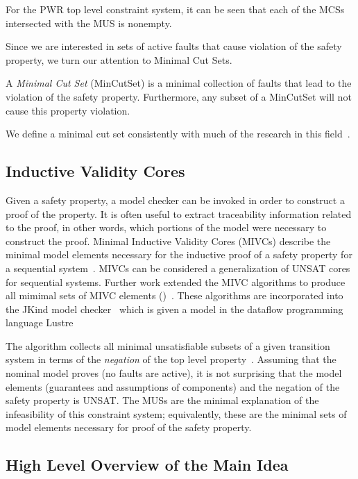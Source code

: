 For the PWR top level constraint system, it can be seen that each of the MCSs intersected with the MUS is nonempty. 

Since we are interested in sets of active faults that cause violation of the safety property, we turn our attention to Minimal Cut Sets. 
\begin{definition}
A \textit{Minimal Cut Set} (MinCutSet) is a minimal collection of faults that lead to the violation of the safety property. Furthermore, any subset of a MinCutSet will not cause this property violation. 
\end{definition}
\noindent
We define a minimal cut set consistently with much of the research in this field~\cite{fta:survey,historyFTA}.

\subsection{Inductive Validity Cores}
Given a safety property, a model checker can be invoked in order to construct a proof of the property.  It is often useful to extract traceability information related to the proof, in
other words, which portions of the model were necessary to construct the proof.  Minimal Inductive Validity Cores (MIVCs) describe the minimal
model elements necessary for the inductive proof of a safety property for a sequential system~\cite{GhassabaniGW16}.  MIVCs can be considered a generalization of UNSAT cores for sequential systems.  Further work extended the MIVC algorithms to produce all mimimal sets of MIVC elements (\aivcalg)~\cite{Ghassabani2017EfficientGO,bendik2018online}.  These algorithms are incorporated into the JKind model checker~\cite{2017arXiv171201222G} which is given a model in the dataflow programming language Lustre~\cite{Halbwachs91:IEEE} 

The \aivcalg algorithm collects all minimal unsatisfiable subsets of a given transition system in terms of the \textit{negation} of the top level property~\cite{Ghassabani2017EfficientGO,bendik2018online}. Assuming that the nominal model proves (no faults are active), it is not surprising that the model elements (guarantees and assumptions of components) and the negation of the safety property is UNSAT. The MUSs are the minimal explanation of the infeasibility of this constraint system; equivalently, these are the minimal sets of model elements necessary for proof of the safety property.

\subsection{High Level Overview of the Main Idea}


